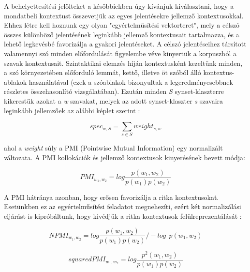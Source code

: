 \documentclass{llncs}
\begin{document}
A behelyettes\'{i}t\'{e}si jel\"{o}lteket a k\'{e}s\H{o}bbiekben \'{u}gy k\'{i}v\'{a}njuk kiv\'{a}lasztani, hogy a mondatbeli kontextust \"{o}sszevetj\"{u}k az egyes jelent\'{e}sekre jellemz\H{o} kontextusokkal. Ehhez l\'{e}tre kell hoznunk egy olyan "egy\'{e}rtelm\H{u}s\'{i}t\'{e}si vektorteret", mely a c\'{e}lsz\'{o} \"{o}sszes k\"{u}l\"{o}nb\"{o}z\H{o} jelent\'{e}s\'{e}nek legink\'{a}bb jellemz\H{o} kontextusait tartalmazza, \'{e}s a lehet\H{o} legkev\'{e}sb\'{e} favoriz\'{a}lja a gyakori jelent\'{e}seket. 
A c\'{e}lsz\'{o} jelent\'{e}seihez t\'{a}rs\'{i}tott valamennyi sz\'{o} minden el\H{o}fordul\'{a}s\'{a}t figyelembe v\'{e}ve kinyert\"{u}k a korpuszb\'{o}l a szavak kontextusait. Szintaktikai elemz\'{e}s h\'{i}j\'{a}n kontextusk\'{e}nt kezelt\"{u}nk minden, a sz\'{o} k\"{o}rnyezet\'{e}ben el\H{o}fordul\'{o} lemm\'{a}t, kett\H{o}, illetve \"{o}t sz\'{o}b\'{o}l \'{a}ll\'{o} kontextus-ablakok haszn\'{a}lat\'{a}val (ezek a sz\'{o}ablakok bizonyultak a legeredm\'{e}nyesebbnek \cite{baroni14} r\'{e}szletes \"{o}sszehasonl\'{i}t\'{o} vizsg\'{a}lat\'{a}ban). Ezut\'{a}n minden \emph{S} synset-klaszterre kikerest\"{u}k azokat a \emph{w} szavakat, melyek az adott synset-klaszter \emph{s} szavaira legink\'{a}bb jellemz\H{o}ek az al\'{a}bbi k\'{e}plet szerint :
 
\begin{equation}
spec_{w,S} = \sum_{s \in S} weight_{s,w}
\end{equation}

ahol a \emph{weight} s\'{u}ly a PMI (Pointwise Mutual Information) egy normaliz\'{a}lt v\'{a}ltozata. A PMI kollok\'{a}ci\'{o}k \'{e}s jellemz\H{o} kontextusok kinyer\'{e}s\'{e}nek bevett m\'{o}dja:

\begin{equation}
PMI_{w_1,w_2} = log \frac{p(w_1, w_2)}{p(w_1) p(w_2)}
\end{equation}

A PMI h\'{a}tr\'{a}nya azonban, hogy er\H{o}sen favoriz\'{a}lja a ritka kontextusokat. Eset\"{u}nkben ez az egy\'{e}rtelm\H{u}s\'{i}t\'{e}si feladatot megnehez\'{i}ti, ez\'{e}rt k\'{e}t normaliz\'{a}l\'{a}si elj\'{a}r\'{a}st is kipr\'{o}b\'{a}ltunk, hogy kiv\'{e}dj\"{u}k a ritka kontextusok fel\"{u}lreprezent\'{a}l\'{a}s\'{a}t \cite{bouma,thanospoulosetal}:

\begin{equation}
NPMI_{w_1,w_2} = log \frac{p(w_1, w_2)}{p(w_1) p(w_2)} / - log ~~ p (w_1, w_2)
\end{equation}

\begin{equation}
squaredPMI_{w_1,w_2} = log \frac{p^{2}(w_1, w_2)}{p(w_1) p(w_2)}
\end{equation}
 
\end{document}
